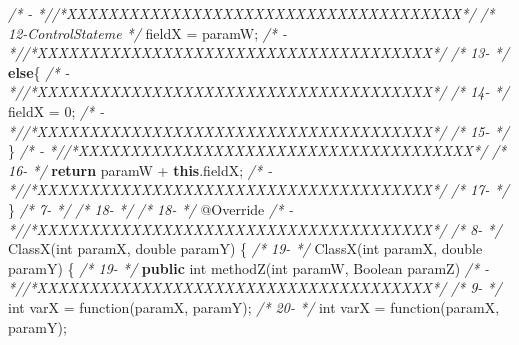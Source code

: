\documentclass[
]{article}
\newenvironment{Shaded}{\begin{snugshade}}{\end{snugshade}}
\newcommand{\AttributeTok}[1]{\textcolor[rgb]{0.77,0.63,0.00}{#1}}
\newcommand{\BuiltInTok}[1]{#1}
\newcommand{\CommentTok}[1]{\textcolor[rgb]{0.56,0.35,0.01}{\textit{#1}}}
\newcommand{\DataTypeTok}[1]{\textcolor[rgb]{0.13,0.29,0.53}{#1}}
\newcommand{\DecValTok}[1]{\textcolor[rgb]{0.00,0.00,0.81}{#1}}
\newcommand{\FunctionTok}[1]{\textcolor[rgb]{0.00,0.00,0.00}{#1}}
\newcommand{\KeywordTok}[1]{\textcolor[rgb]{0.13,0.29,0.53}{\textbf{#1}}}
\newcommand{\NormalTok}[1]{#1}
\begin{document}
\begin{landscape}
\begin{Shaded}
\begin{Highlighting}[]
\CommentTok{/*   -                 *//*XXXXXXXXXXXXXXXXXXXXXXXXXXXXXXXXXXXXXX*/}                     \CommentTok{/* 12-ControlStateme   */}\NormalTok{            fieldX = paramW;                                   }
\CommentTok{/*   -                 *//*XXXXXXXXXXXXXXXXXXXXXXXXXXXXXXXXXXXXXX*/}                     \CommentTok{/* 13-                 */}        \KeywordTok{else}\NormalTok{\{                                                  }
\CommentTok{/*   -                 *//*XXXXXXXXXXXXXXXXXXXXXXXXXXXXXXXXXXXXXX*/}                     \CommentTok{/* 14-                 */}\NormalTok{            fieldX = }\DecValTok{0}\NormalTok{;                                        }
\CommentTok{/*   -                 *//*XXXXXXXXXXXXXXXXXXXXXXXXXXXXXXXXXXXXXX*/}                     \CommentTok{/* 15-                 */}\NormalTok{        \}                                                      }
\CommentTok{/*   -                 *//*XXXXXXXXXXXXXXXXXXXXXXXXXXXXXXXXXXXXXX*/}                     \CommentTok{/* 16-                 */}        \KeywordTok{return}\NormalTok{ paramW + }\KeywordTok{this}\NormalTok{.}\FunctionTok{fieldX}\NormalTok{;                           }
\CommentTok{/*   -                 *//*XXXXXXXXXXXXXXXXXXXXXXXXXXXXXXXXXXXXXX*/}                     \CommentTok{/* 17-                 */}\NormalTok{     \}                                                         }
\CommentTok{/*  7-                 */}                                                               \CommentTok{/* 18-                 */}                                                               
\CommentTok{/* 18-                 */}    \AttributeTok{@Override}                                                  \CommentTok{/*   -                 *//*XXXXXXXXXXXXXXXXXXXXXXXXXXXXXXXXXXXXXX*/}                     
\CommentTok{/*  8-                 */}    \FunctionTok{ClassX}\NormalTok{(}\DataTypeTok{int}\NormalTok{ paramX, }\DataTypeTok{double}\NormalTok{ paramY) \{                                }\CommentTok{/* 19-                 */}    \FunctionTok{ClassX}\NormalTok{(}\DataTypeTok{int}\NormalTok{ paramX, }\DataTypeTok{double}\NormalTok{ paramY) \{                                }
\CommentTok{/* 19-                 */}    \KeywordTok{public} \DataTypeTok{int} \FunctionTok{methodZ}\NormalTok{(}\DataTypeTok{int}\NormalTok{ paramW, }\BuiltInTok{Boolean}\NormalTok{ paramZ)             }\CommentTok{/*   -                 *//*XXXXXXXXXXXXXXXXXXXXXXXXXXXXXXXXXXXXXX*/}                     
\CommentTok{/*  9-                 */}        \DataTypeTok{int}\NormalTok{ varX = }\FunctionTok{function}\NormalTok{(paramX, paramY);                          }\CommentTok{/* 20-                 */}        \DataTypeTok{int}\NormalTok{ varX = }\FunctionTok{function}\NormalTok{(paramX, paramY);                           }

\end{Highlighting}
\end{Shaded}
\end{landscape}
\end{document}
